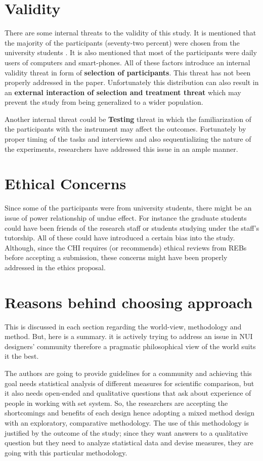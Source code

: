 \documentclass{sigchi}
\begin{document}
\section{Validity}
There are some internal threats to the validity of this study. It is mentioned that the majority of the participants (seventy-two percent) were chosen from the university students \cite{10.1093/iwc/iwv003}. It is also mentioned that most of the participants were daily users of computers and smart-phones. All of these factors introduce an internal validity threat in form of \textbf{selection of participants}. This threat has not been properly addressed in the paper. Unfortunately this distribution can also result in an \textbf{external interaction of selection and treatment threat} which may prevent the study from being generalized to a wider population.

Another internal threat could be \textbf{Testing} threat in which the familiarization of the participants with the instrument may affect the outcomes. Fortunately by proper timing of the tasks and interviews and also sequentializing the nature of the experiments, researchers have addressed this issue in an ample manner.

\section{Ethical Concerns}
Since some of the participants were from university students, there might be an issue of power relationship of undue effect. For instance the graduate students could have been friends of the research staff or students studying under the staff's tutorship. All of these could have introduced a certain bias into the study. Although, since the CHI requires (or recommends) ethical reviews from REBs before accepting a submission, these concerns might have been properly addressed in the ethics proposal.

\section{Reasons behind choosing approach}
This is discussed in each section regarding the world-view, methodology and method. But, here is a summary. it is actively trying to address an issue in NUI designers' community therefore a pragmatic philosophical view of the world suits it the best. 

The authors are going to provide guidelines for a community and achieving this goal needs statistical analysis of different measures for scientific comparison, but it also needs open-ended and qualitative questions that ask about experience of people in working with set system. So, the researchers are accepting the shortcomings and benefits of each design hence adopting a mixed method design with an exploratory, comparative methodology. The use of this methodology is justified by the outcome of the study; since they want answers to a qualitative question but they need to analyze statistical data and devise measures, they are going with this particular methodology. 
\end{document}
